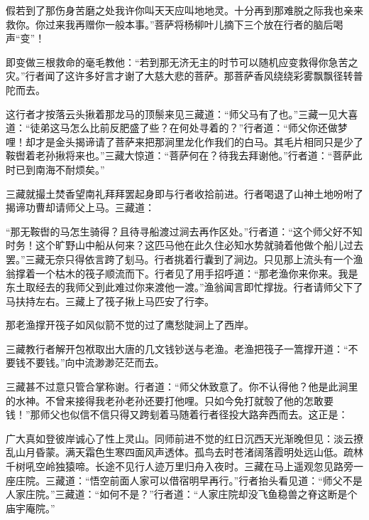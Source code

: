 \documentclass[12pt,UTF8]{ctexbook}
\begin{document}
{假若到了那伤身苦磨之处我许你叫天天应叫地地灵。十分再到那难脱之际我也亲来救你。你过来我再赠你一般本事。”菩萨将杨柳叶儿摘下三个放在行者的脑后喝声“变”！

即变做三根救命的毫毛教他：“若到那无济无主的时节可以随机应变救得你急苦之灾。”行者闻了这许多好言才谢了大慈大悲的菩萨。那菩萨香风绕绕彩雾飘飘径转普陀而去。

这行者才按落云头揪着那龙马的顶鬃来见三藏道：“师父马有了也。”三藏一见大喜道：“徒弟这马怎么比前反肥盛了些？在何处寻着的？”行者道：“师父你还做梦哩！却才是金头揭谛请了菩萨来把那涧里龙化作我们的白马。其毛片相同只是少了鞍辔着老孙揪将来也。”三藏大惊道：“菩萨何在？待我去拜谢他。”行者道：“菩萨此时已到南海不耐烦矣。”

三藏就撮土焚香望南礼拜拜罢起身即与行者收拾前进。行者喝退了山神土地吩咐了揭谛功曹却请师父上马。三藏道：

“那无鞍辔的马怎生骑得？且待寻船渡过涧去再作区处。”行者道：“这个师父好不知时务！这个旷野山中船从何来？这匹马他在此久住必知水势就骑着他做个船儿过去罢。”三藏无奈只得依言跨了刬马。行者挑着行囊到了涧边。只见那上流头有一个渔翁撑着一个枯木的筏子顺流而下。行者见了用手招呼道：“那老渔你来你来。我是东土取经去的我师父到此难过你来渡他一渡。”渔翁闻言即忙撑拢。行者请师父下了马扶持左右。三藏上了筏子揪上马匹安了行李。

那老渔撑开筏子如风似箭不觉的过了鹰愁陡涧上了西岸。

三藏教行者解开包袱取出大唐的几文钱钞送与老渔。老渔把筏子一篙撑开道：“不要钱不要钱。”向中流渺渺茫茫而去。

三藏甚不过意只管合掌称谢。行者道：“师父休致意了。你不认得他？他是此涧里的水神。不曾来接得我老孙老孙还要打他哩。只如今免打就彀了他的怎敢要钱！”那师父也似信不信只得又跨刬着马随着行者径投大路奔西而去。这正是：

广大真如登彼岸诚心了性上灵山。同师前进不觉的红日沉西天光渐晚但见：淡云撩乱山月昏蒙。满天霜色生寒四面风声透体。孤鸟去时苍渚阔落霞明处远山低。疏林千树吼空岭独猿啼。长途不见行人迹万里归舟入夜时。三藏在马上遥观忽见路旁一座庄院。三藏道：“悟空前面人家可以借宿明早再行。”行者抬头看见道：“师父不是人家庄院。”三藏道：“如何不是？”行者道：“人家庄院却没飞鱼稳兽之脊这断是个庙宇庵院。”

}
\end{document}
